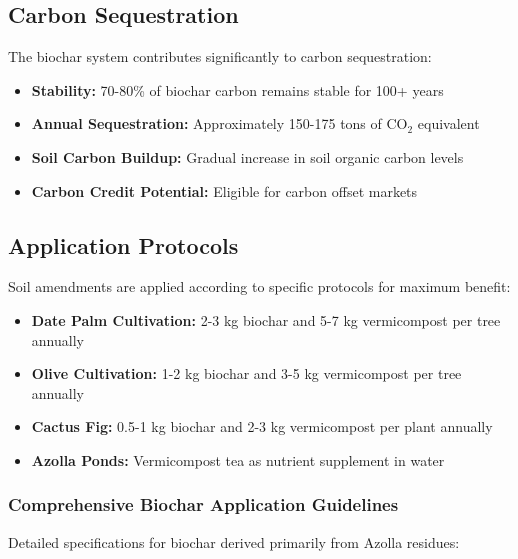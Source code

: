 \subsection{Carbon Sequestration}

The biochar system contributes significantly to carbon sequestration:

\begin{itemize}
    \item \textbf{Stability:} 70-80\% of biochar carbon remains stable for 100+ years
    \item \textbf{Annual Sequestration:} Approximately 150-175 tons of CO$_2$ equivalent
    \item \textbf{Soil Carbon Buildup:} Gradual increase in soil organic carbon levels
    \item \textbf{Carbon Credit Potential:} Eligible for carbon offset markets
\end{itemize}

\subsection{Application Protocols}

Soil amendments are applied according to specific protocols for maximum benefit:

\begin{itemize}
    \item \textbf{Date Palm Cultivation:} 2-3 kg biochar and 5-7 kg vermicompost per tree annually
    \item \textbf{Olive Cultivation:} 1-2 kg biochar and 3-5 kg vermicompost per tree annually
    \item \textbf{Cactus Fig:} 0.5-1 kg biochar and 2-3 kg vermicompost per plant annually
    \item \textbf{Azolla Ponds:} Vermicompost tea as nutrient supplement in water
\end{itemize}

\subsubsection{Comprehensive Biochar Application Guidelines}

Detailed specifications for biochar derived primarily from Azolla residues:


